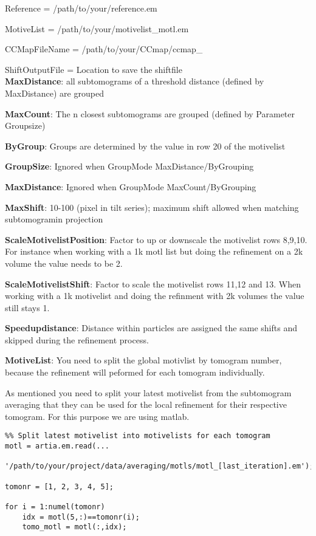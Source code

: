\documentclass[12pt,a4paper]{scrartcl}
\begin{document}
{Reference = /path/to/your/reference.em  

MotiveList = /path/to/your/motivelist\_motl.em

CCMapFileName = /path/to/your/CCmap/ccmap\_ 

ShiftOutputFile = Location to save the shiftfile \\


\textbf{MaxDistance}: all subtomograms of a threshold distance (defined by MaxDistance) are grouped 

\textbf{MaxCount}: The n closest subtomograms are grouped (defined by Parameter Groupsize)

\textbf{ByGroup}: Groups are determined by the value in row 20 of the motivelist

\textbf{GroupSize}: Ignored when GroupMode MaxDistance/ByGrouping

\textbf{MaxDistance}: Ignored when GroupMode MaxCount/ByGrouping 

\textbf{MaxShift}: 10-100 (pixel in tilt series); maximum shift allowed when matching subtomogramin projection 

\textbf{ScaleMotivelistPosition}: Factor to up or downscale the motivelist rows 8,9,10. For instance when working with a 1k motl list but doing the refinement on a 2k volume the value needs to be 2.  
          
\textbf{ScaleMotivelistShift}: Factor to scale the motivelist rows 11,12 and 13. When working with a 1k motivelist and doing the refinment with 2k volumes the value still stays 1. 

\textbf{Speedupdistance}: Distance within particles are assigned the same shifts and skipped during the refinement process.
 
\textbf{MotiveList}: You need to split the global motivlist by tomogram number, because the refinement will peformed for each tomogram individually.

As mentioned you need to split your latest motivelist from the subtomogram averaging that they can be used for the local refinement for their respective tomogram.
For this purpose we are using matlab. \\

\begin{lstlisting}
%% Split latest motivelist into motivelists for each tomogram
motl = artia.em.read(...
    '/path/to/your/project/data/averaging/motls/motl_[last_iteration].em');

tomonr = [1, 2, 3, 4, 5];

for i = 1:numel(tomonr)
    idx = motl(5,:)==tomonr(i);
    tomo_motl = motl(:,idx);
    

\end{lstlisting}}
\end{document}
